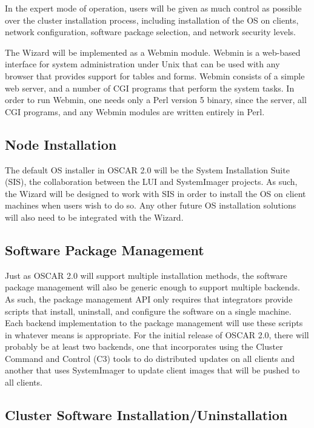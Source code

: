 In the expert mode of operation, users will be given as much control
as possible over the cluster installation process, including
installation of the OS on clients, network configuration, software
package selection, and network security levels.

The Wizard will be implemented as a Webmin module. Webmin is a
web-based interface for system administration under Unix that can be
used with any browser that provides support for tables and
forms. Webmin consists of a simple web server, and a number of CGI
programs that perform the system tasks. In order to run Webmin, one
needs only a Perl version 5 binary, since the server, all CGI
programs, and any Webmin modules are written entirely in Perl.

\subsection{Node Installation}

The default OS installer in OSCAR 2.0 will be the System Installation
Suite (SIS), the collaboration between the LUI and SystemImager
projects. As such, the Wizard will be designed to work with SIS in
order to install the OS on client machines when users wish to do
so. Any other future OS installation solutions will also need to be
integrated with the Wizard.

\subsection{Software Package Management}
\label{sec:design-software-package-mgmt}

Just as OSCAR 2.0 will support multiple installation methods, the
software package management will also be generic enough to support
multiple backends. As such, the package management API only requires
that integrators provide scripts that install, uninstall, and
configure the software on a single machine. Each backend
implementation to the package management will use these scripts in
whatever means is appropriate. For the initial release of OSCAR 2.0,
there will probably be at least two backends, one that incorporates
using the Cluster Command and Control (C3) tools to do distributed
updates on all clients and another that uses SystemImager to update
client images that will be pushed to all clients.

\subsection{Cluster Software Installation/Uninstallation}

